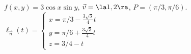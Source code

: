 {$f(x,y) = 3\cos x\sin y$,  $\vec v = \la 1,2\ra$, $P=(\pi/3, \pi/6)$.
}
{
$\ell_{\vec n}(t) = \left\{\begin{array}{l} x = \pi/3-\frac{3\sqrt{3}}{4}t\\ y = \pi/6+\frac{3\sqrt{3}}{4}t \\ z = 3/4 -t \end{array} \right.$ 
}